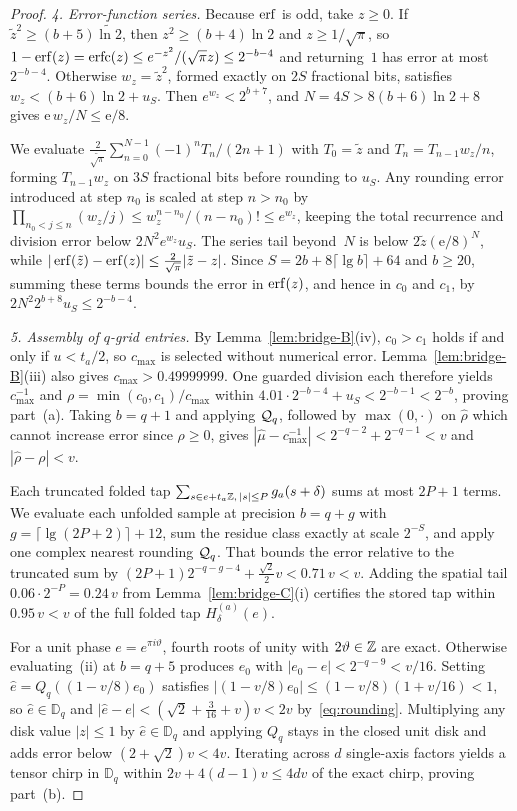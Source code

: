 \begin{proof}
\emph{4. Error-function series.}
Because $\operatorname{erf}$ is odd, take $z\ge 0$. If $\tilde z^2\ge(b+5)\widetilde{\ln 2}$, then $z^2\ge(b+4)\ln 2$ and $z\ge 1/\sqrt\pi$, so $1-\operatorname{erf}(z)=\operatorname{erfc}(z)\le e^{-z^2}/(\sqrt\pi z)\le 2^{-b-4}$ and returning~$1$ has error at most $2^{-b-4}$. Otherwise $w_z=\tilde z^2$, formed exactly on $2S$ fractional bits, satisfies $w_z<(b+6)\ln 2+u_S$. Then $e^{w_z}<2^{b+7}$, and $N=4S>8(b+6)\ln 2+8$ gives $\mathrm e\,w_z/N\le\mathrm e/8$.

We evaluate $\frac{2}{\widetilde{\sqrt\pi}}\sum_{n=0}^{N-1}(-1)^n T_n/(2n+1)$ with $T_0=\tilde z$ and $T_n=T_{n-1}w_z/n$, forming $T_{n-1}w_z$ on $3S$ fractional bits before rounding to $u_S$. Any rounding error introduced at step $n_0$ is scaled at step $n>n_0$ by $\prod_{n_0<j\le n}(w_z/j)\le w_z^{n-n_0}/(n-n_0)!\le e^{w_z}$, keeping the total recurrence and division error below $2N^2 e^{w_z}u_S$. The series tail beyond~$N$ is below $2\tilde z(\mathrm e/8)^N$, while $|\operatorname{erf}(\tilde z)-\operatorname{erf}(z)|\le\frac{2}{\sqrt\pi}|\tilde z-z|$. Since $S=2b+8\lceil\lg b\rceil+64$ and $b\ge 20$, summing these terms bounds the error in $\operatorname{erf}(z)$, and hence in $c_0$ and $c_1$, by $2N^2 2^{b+8}u_S\le 2^{-b-4}$.

\emph{5. Assembly of $q$-grid entries.}
By Lemma~\ref{lem:bridge-B}(iv), $c_0>c_1$ holds if and only if $u<t_a/2$, so $c_{\max}$ is selected without numerical error. Lemma~\ref{lem:bridge-B}(iii) also gives $c_{\max}>0.49999999$. One guarded division each therefore yields $c_{\max}^{-1}$ and $\rho=\min(c_0,c_1)/c_{\max}$ within $4.01\cdot 2^{-b-4}+u_S<2^{-b-1}<2^{-b}$, proving part~(a). Taking $b=q+1$ and applying $\mathcal{Q}_q$, followed by $\max(0,\cdot)$ on $\hat\rho$ which cannot increase error since $\rho\ge 0$, gives $|\hat\mu-c_{\max}^{-1}|<2^{-q-2}+2^{-q-1}<v$ and $|\hat\rho-\rho|<v$.

Each truncated folded tap $\sum_{s\in e+t_a\mathbb{Z},\,|s|\le P}g_a(s+\delta)$ sums at most $2P+1$ terms. We evaluate each unfolded sample at precision $b=q+g$ with $g=\lceil\lg(2P+2)\rceil+12$, sum the residue class exactly at scale $2^{-S}$, and apply one complex nearest rounding $\mathcal{Q}_q$. That bounds the error relative to the truncated sum by $(2P+1)2^{-q-g-4}+\frac{\sqrt2}{2}v<0.71\,v<v$. Adding the spatial tail $0.06\cdot 2^{-P}=0.24\,v$ from Lemma~\ref{lem:bridge-C}(i) certifies the stored tap within $0.95\,v<v$ of the full folded tap $H^{(a)}_\delta(e)$.

For a unit phase $e=e^{\pi i\vartheta}$, fourth roots of unity with $2\vartheta\in\mathbb{Z}$ are exact. Otherwise evaluating~(ii) at $b=q+5$ produces $e_0$ with $|e_0-e|<2^{-q-9}<v/16$. Setting $\hat e=Q_q((1-v/8)e_0)$ satisfies $|(1-v/8)e_0|\le(1-v/8)(1+v/16)<1$, so $\hat e\in\mathbb{D}_q$ and $|\hat e-e|<(\sqrt2+\tfrac{3}{16}+v)v<2v$ by~\eqref{eq:rounding}. Multiplying any disk value $|z|\le 1$ by $\hat e\in\mathbb{D}_q$ and applying $Q_q$ stays in the closed unit disk and adds error below $(2+\sqrt2)v<4v$. Iterating across $d$ single-axis factors yields a tensor chirp in $\mathbb{D}_q$ within $2v+4(d-1)v\le 4dv$ of the exact chirp, proving part~(b).


\end{proof}
